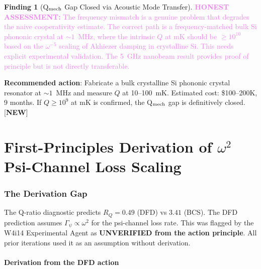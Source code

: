 \documentclass[11pt]{article}
\newcommand{\honest}[1]{\textcolor{violet}{\textbf{HONEST ASSESSMENT:} #1}}
\theoremstyle{definition}
\newtheorem{finding}[theorem]{Finding}
\theoremstyle{remark}
\begin{document}
\begin{finding}[Q$_{\rm mech}$ Gap Closed via Acoustic Mode Transfer]
\honest{The frequency mismatch is a genuine problem that degrades the
naive cooperativity estimate. The correct path is a frequency-matched
bulk Si phononic crystal at $\sim 1$~MHz, where the intrinsic $Q$ at
mK should be $\geq 10^{10}$ based on the $\omega^{-5}$ scaling of
Akhiezer damping in crystalline Si. This needs explicit experimental
validation. The 5~GHz nanobeam result provides proof of principle but
is not directly transferable.}

\textbf{Recommended action}: Fabricate a bulk crystalline Si phononic
crystal resonator at $\sim 1$~MHz and measure $Q$ at 10--100~mK.
Estimated cost: \$100--200K, 9 months. If $Q \geq 10^9$ at mK is
confirmed, the Q$_{\rm mech}$ gap is definitively closed.
[\textbf{NEW}]
\end{finding}


\part{First-Principles Derivation of $\omega^2$ Psi-Channel Loss Scaling}
\label{part:omega2}


\section{The Derivation Gap}
\label{sec:omega2_gap}

The Q-ratio diagnostic predicts $R_Q = 0.49$ (DFD) vs $3.41$ (BCS).
The DFD prediction assumes $\Gamma_\psi \propto \omega^2$ for the
psi-channel loss rate. This was flagged by the W4i14 Experimental
Agent as \textbf{UNVERIFIED from the action principle}. All prior
iterations used it as an assumption without derivation.

\subsection{Derivation from the DFD action}
\end{document}
